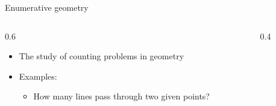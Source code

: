 \documentclass{beamer}
\theoremstyle{definition}
\begin{document}
    \begin{frame}{Enumerative geometry}

      \begin{columns}[c]
        \begin{column}{0.6\hsize}
      
          \begin{itemize}
          \item The study of counting problems in geometry
          \item Examples: \begin{itemize}
          \item How many lines pass through two given points?
          \end{itemize}
          \end{itemize}
        \end{column}
        \begin{column}{0.4\hsize}

          \centering
          \vspace*{1.2in}
          
        \end{column}
      \end{columns}
    \end{frame}
\end{document}
